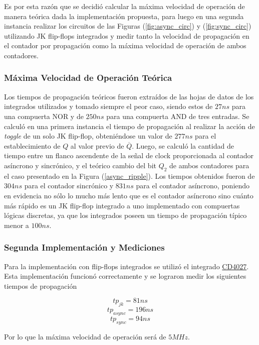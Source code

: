 Es por esta razón que se decidió calcular la máxima velocidad de operación de manera teórica dada la implementación propuesta, para luego en una segunda instancia realizar los circuitos de las Figuras (\ref{fig:async_circ}) y (\ref{fig:sync_circ}) utilizando JK flip-flops integrados y medir tanto la velocidad de propagación en el contador por propagación como la máxima velocidad de operación de ambos contadores.

\subsubsection{Máxima Velocidad de Operación Teórica}

Los tiempos de propagación teóricos fueron extraídos de las hojas de datos de los integrados utilizados y tomado siempre el peor caso, siendo estos de $27ns$ para una compuerta NOR y de $250ns$ para una compuerta AND de tres entradas. Se calculó en una primera instancia el tiempo de propagación al realizar la acción de \textit{toggle} de un solo JK flip-flop, obteniéndose un valor de $277 ns$ para el establecimiento de $Q$ al valor previo de $\overline{Q}$. Luego, se calculó la cantidad de tiempo entre un flanco ascendente de la señal de clock proporcionada al contador asíncrono y sincrónico, y el teórico cambio del bit $Q_2$ de ambos contadores para el caso presentado en la Figura (\ref{async_ripple}). Los tiempos obtenidos fueron de $304 ns$ para el contador sincrónico y $831 ns$ para el contador asíncrono, poniendo en evidencia no sólo lo mucho más lento que es el contador asíncrono sino cuánto más rápido es un JK flip-flop integrado a uno implementado con compuertas lógicas discretas, ya que los integrados poseen un tiempo de propagación típico menor a $100ns$. 

\subsubsection{Segunda Implementación y Mediciones}
Para la implementación con flip-flops integrados se utilizó el integrado \href{http://www.sycelectronica.com.ar/semiconductores/CD4027.pdf}{CD4027}. Esta implementación funcionó correctamente y se lograron medir los siguientes tiempos de propagación

$$tp_{jk}=81ns$$
$$tp_{async}=196ns$$
$$tp_{sync}=94ns$$

Por lo que la máxima velocidad de operación será de $5MHz$.


